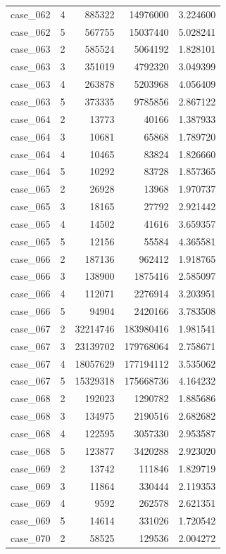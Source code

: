 \begin{longtable}{lrrrr}
case\_062 & 4 & 885322 & 14976000 & 3.224600 \\
case\_062 & 5 & 567755 & 15037440 & 5.028241 \\
case\_063 & 2 & 585524 & 5064192 & 1.828101 \\
case\_063 & 3 & 351019 & 4792320 & 3.049399 \\
case\_063 & 4 & 263878 & 5203968 & 4.056409 \\
case\_063 & 5 & 373335 & 9785856 & 2.867122 \\
case\_064 & 2 & 13773 & 40166 & 1.387933 \\
case\_064 & 3 & 10681 & 65868 & 1.789720 \\
case\_064 & 4 & 10465 & 83824 & 1.826660 \\
case\_064 & 5 & 10292 & 83728 & 1.857365 \\
case\_065 & 2 & 26928 & 13968 & 1.970737 \\
case\_065 & 3 & 18165 & 27792 & 2.921442 \\
case\_065 & 4 & 14502 & 41616 & 3.659357 \\
case\_065 & 5 & 12156 & 55584 & 4.365581 \\
case\_066 & 2 & 187136 & 962412 & 1.918765 \\
case\_066 & 3 & 138900 & 1875416 & 2.585097 \\
case\_066 & 4 & 112071 & 2276914 & 3.203951 \\
case\_066 & 5 & 94904 & 2420166 & 3.783508 \\
case\_067 & 2 & 32214746 & 183980416 & 1.981541 \\
case\_067 & 3 & 23139702 & 179768064 & 2.758671 \\
case\_067 & 4 & 18057629 & 177194112 & 3.535062 \\
case\_067 & 5 & 15329318 & 175668736 & 4.164232 \\
case\_068 & 2 & 192023 & 1290782 & 1.885686 \\
case\_068 & 3 & 134975 & 2190516 & 2.682682 \\
case\_068 & 4 & 122595 & 3057330 & 2.953587 \\
case\_068 & 5 & 123877 & 3420288 & 2.923020 \\
case\_069 & 2 & 13742 & 111846 & 1.829719 \\
case\_069 & 3 & 11864 & 330444 & 2.119353 \\
case\_069 & 4 & 9592 & 262578 & 2.621351 \\
case\_069 & 5 & 14614 & 331026 & 1.720542 \\
case\_070 & 2 & 58525 & 129536 & 2.004272 \\

\end{longtable}
